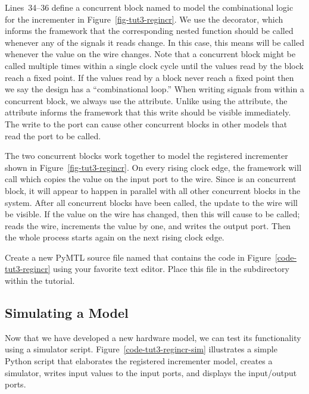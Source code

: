 \documentclass{cbxdoc}
\begin{document}
Lines~34--36 define a concurrent block named  to model the
combinational logic for the incrementer in Figure~\ref{fig-tut3-regincr}.
We use the  decorator, which informs the framework
that the corresponding nested function should be called whenever any of
the signals it reads change. In this case, this means  will be
called whenever the value on the  wire changes. Note that a
 concurrent block might be called multiple times
within a single clock cycle until the values read by the block reach a
fixed point. If the values read by a  block never
reach a fixed point then we say the design has a ``combinational loop.''
When writing signals from within a  concurrent block,
we always use the  attribute. Unlike using the 
attribute, the  attribute informs the framework that this write
should be visible immediately. The write to the  port can cause
other  concurrent blocks in other models that read
the  port to be called.

The two concurrent blocks work together to model the registered
incrementer shown in Figure~\ref{fig-tut3-regincr}. On every rising clock
edge, the framework will call  which copies the value on the
input port to the  wire. Since  is an 
concurrent block, it will appear to happen in parallel with all other
 concurrent blocks in the system. After all 
concurrent blocks have been called, the update to the  wire
will be visible. If the value on the  wire has changed, then
this will cause  to be called;  reads the
 wire, increments the value by one, and writes the output
port. Then the whole process starts again on the next rising clock edge.

Create a new PyMTL source file named  that contains the
code in Figure~\ref{code-tut3-regincr} using your favorite text editor.
Place this file in the  subdirectory within the
tutorial.

\subsection{Simulating a Model}

Now that we have developed a new hardware model, we can test its
functionality using a simulator script.
Figure~\ref{code-tut3-regincr-sim} illustrates a simple Python script
that elaborates the registered incrementer model, creates a simulator,
writes input values to the input ports, and displays the input/output
ports.
\end{document}
